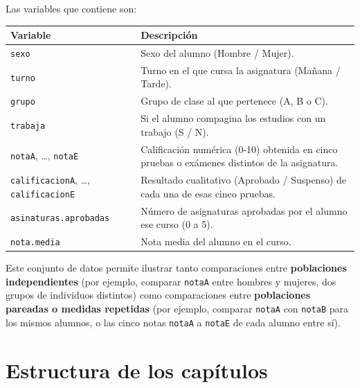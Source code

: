 \documentclass[
  spanish,
  a4paper,
]{scrreport}
\newcounter{none} %
\theoremstyle{definition}
\theoremstyle{definition}
\theoremstyle{remark}
\begin{document}
Las variables que contiene son:

{\def\LTcaptype{none} %
\begin{longtable}[]{@{}
  >{\raggedright\arraybackslash}p{}
  >{\raggedright\arraybackslash}p{}@{}}
\toprule\noalign{}
\begin{minipage}[b]{\linewidth}\raggedright
Variable
\end{minipage} & \begin{minipage}[b]{\linewidth}\raggedright
Descripción
\end{minipage} \\
\midrule\noalign{}
\endhead
\bottomrule\noalign{}
\endlastfoot
\texttt{sexo} & Sexo del alumno (Hombre / Mujer). \\
\texttt{turno} & Turno en el que cursa la asignatura (Mañana /
Tarde). \\
\texttt{grupo} & Grupo de clase al que pertenece (A, B o C). \\
\texttt{trabaja} & Si el alumno compagina los estudios con un trabajo (S
/ N). \\
\texttt{notaA}, \ldots, \texttt{notaE} & Calificación numérica (0-10)
obtenida en cinco pruebas o exámenes distintos de la asignatura. \\
\texttt{calificacionA}, \ldots, \texttt{calificacionE} & Resultado
cualitativo (Aprobado / Suspenso) de cada una de esas cinco pruebas. \\
\texttt{asinaturas.aprobadas} & Número de asignaturas aprobadas por el
alumno ese curso (0 a 5). \\
\texttt{nota.media} & Nota media del alumno en el curso. \\
\end{longtable}
}

Este conjunto de datos permite ilustrar tanto comparaciones entre
\textbf{poblaciones independientes} (por ejemplo, comparar
\texttt{notaA} entre hombres y mujeres, dos grupos de individuos
distintos) como comparaciones entre \textbf{poblaciones pareadas o
medidas repetidas} (por ejemplo, comparar \texttt{notaA} con
\texttt{notaB} para los mismos alumnos, o las cinco notas \texttt{notaA}
a \texttt{notaE} de cada alumno entre sí).

\section{Estructura de los
capítulos}\label{estructura-de-los-capuxedtulos}
\end{document}
